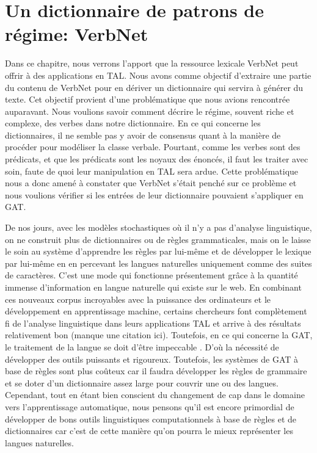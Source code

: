 
\chapter{Un dictionnaire de patrons de régime: VerbNet}

Dans ce chapitre, nous verrons l'apport que la ressource lexicale VerbNet peut offrir à des applications en \ac{TAL}. Nous avons comme objectif d'extraire une partie du contenu de VerbNet pour en dériver un dictionnaire qui servira à générer du texte. Cet objectif provient d'une problématique que nous avions rencontrée auparavant. Nous voulions savoir comment décrire le régime, souvent riche et complexe, des verbes dans notre dictionnaire. En ce qui concerne les dictionnaires, il ne semble pas y avoir de consensus quant à la manière de procéder pour modéliser la classe verbale. Pourtant, comme les verbes sont des prédicats, et que les prédicats sont les noyaux des énoncés, il faut les traiter avec soin, faute de quoi leur manipulation en \ac{TAL} sera ardue. Cette problématique nous a donc amené à constater que VerbNet s'était penché sur ce problème et nous voulions vérifier si les entrées de leur dictionnaire pouvaient s'appliquer en \ac{GAT}.

De nos jours, avec les modèles stochastiques où il n'y a pas d'analyse linguistique, on ne construit plus de dictionnaires ou de règles grammaticales, mais on le laisse le soin au système d'apprendre les règles par lui-même et de développer le lexique par lui-même en en percevant les langues naturelles uniquement comme des suites de caractères. C'est une mode qui fonctionne présentement grâce à la quantité immense d'information en langue naturelle qui existe sur le web. En combinant ces nouveaux corpus incroyables avec la puissance des ordinateurs et le développement en apprentissage machine, certains chercheurs font complètement fi de l'analyse linguistique dans leurs applications TAL et arrive à des résultats relativement bon (manque une citation ici). Toutefois, en ce qui concerne la GAT, le traitement de la langue se doit d'être impeccable \citep{lareau18}. D'où la nécessité de développer des outils puissants et rigoureux. Toutefois, les systèmes de GAT à base de règles sont plus coûteux car il faudra développer les règles de grammaire et se doter d'un dictionnaire assez large pour couvrir une ou des langues. Cependant, tout en étant bien conscient du changement de cap dans le domaine vers l'apprentissage automatique, nous pensons qu'il est encore primordial de développer de bons outils linguistiques computationnels à base de règles et de dictionnaires car c'est de cette manière qu'on pourra le mieux représenter les langues naturelles.

